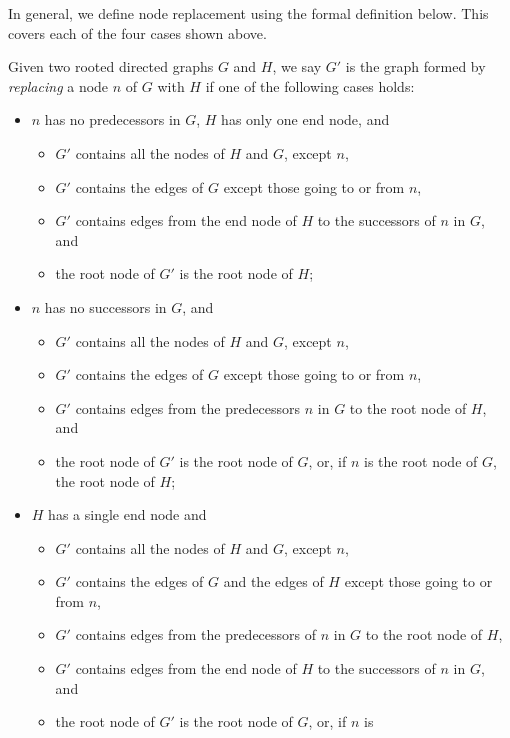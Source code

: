 In general, we define node replacement using the formal definition
below.
This covers each of the four cases shown above.
\begin{defn}
  Given two rooted directed graphs $G$ and $H$, we say $G'$ is the
  graph formed by \emph{replacing} a node $n$ of $G$ with $H$ if one
  of the following cases holds:
  \begin{itemize}
  \item $n$ has no predecessors in $G$, $H$ has only one end node, and
    \begin{itemize}
    \item $G'$ contains all the nodes of $H$ and $G$, except $n$,
    \item $G'$ contains the edges of $G$ except those going to or from
      $n$,
    \item $G'$ contains edges from the end node of $H$ to the
      successors of $n$ in $G$, and
    \item the root node of $G'$ is the root node of $H$;
    \end{itemize}
  \item $n$ has no successors in $G$, and
    \begin{itemize}
    \item $G'$ contains all the nodes of $H$ and $G$, except $n$,
    \item $G'$ contains the edges of $G$ except those going to or from
      $n$,
    \item $G'$ contains edges from the predecessors $n$ in $G$ to the
      root node of $H$, and
    \item the root node of $G'$ is the root node of $G$, or, if $n$ is
      the root node of $G$, the root node of $H$;
    \end{itemize}
  \item $H$ has a single end node and
    \begin{itemize}
    \item $G'$ contains all the nodes of $H$ and $G$, except $n$,
    \item $G'$ contains the edges of $G$ and the edges of $H$ except
      those going to or from $n$,
    \item $G'$ contains edges from the predecessors of $n$ in $G$ to
      the root node of $H$,
    \item $G'$ contains edges from the end node of $H$ to the
      successors of $n$ in $G$, and
    \item the root node of $G'$ is the root node of $G$, or, if $n$ is

\end{itemize}
\end{itemize}
\end{defn}
